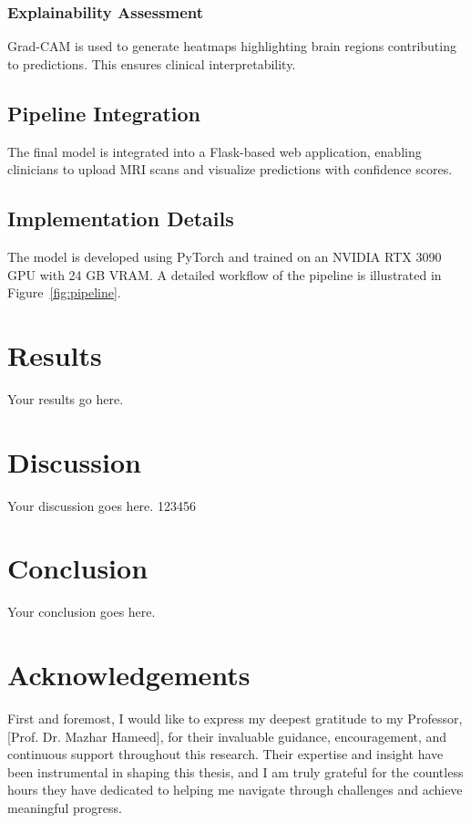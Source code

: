 \documentclass[12pt,twocolumn]{report}
\begin{document}
\subsection{Explainability Assessment}
Grad-CAM is used to generate heatmaps highlighting brain regions contributing to predictions. This ensures clinical interpretability.

\section{Pipeline Integration}

The final model is integrated into a Flask-based web application, enabling clinicians to upload MRI scans and visualize predictions with confidence scores.

\section{Implementation Details}

The model is developed using PyTorch and trained on an NVIDIA RTX 3090 GPU with 24 GB VRAM. A detailed workflow of the pipeline is illustrated in Figure~\ref{fig:pipeline}.



\chapter{Results}
Your results go here.

\chapter{Discussion}
Your discussion goes here. 123456

\chapter{Conclusion}
Your conclusion goes here.

\chapter*{Acknowledgements}

First and foremost, I would like to express my deepest gratitude to my Professor, [Prof. Dr. Mazhar Hameed], for their invaluable guidance, encouragement, and continuous support throughout this research. Their expertise and insight have been instrumental in shaping this thesis, and I am truly grateful for the countless hours they have dedicated to helping me navigate through challenges and achieve meaningful progress.
\end{document}
